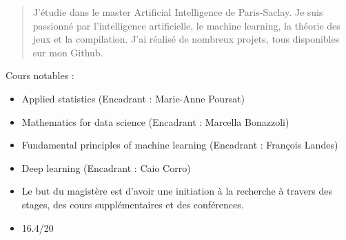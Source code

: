 \documentclass[10pt,a4paper,ragged2e,withhyper]{altacv}
\begin{document}
\begin{paracol}{2}
        
        
        \newpage
        
        \switchcolumn
        
            \begin{quote}
                J'étudie dans le master Artificial Intelligence de Paris-Saclay.
                Je suis passionné par l'intelligence artificielle, le machine learning, la théorie des jeux et
                la compilation.
                J'ai réalisé de nombreux projets, tous disponibles sur mon Github.
            \end{quote}
        
        
            Cours notables :
            \vspace{2pt}
            \begin{itemize}
                \item Applied statistics (Encadrant : Marie-Anne Poursat)
                \item Mathematics for data science (Encadrant : Marcella Bonazzoli)
                \item Fundamental principles of machine learning (Encadrant : François Landes)
                \item Deep learning (Encadrant : Caio Corro)
            \end{itemize}
            \divider

            \begin{itemize}
              \item Le but du magistère est d'avoir une initiation à la recherche à travers des stages, des cours supplémentaires et des conférences.
              \item 16.4/20
            \end{itemize}
            \divider


\end{paracol}
\end{document}
